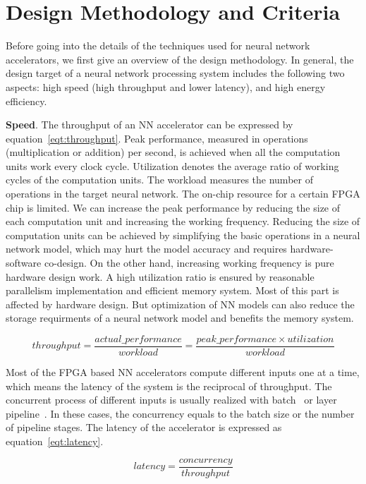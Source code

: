 \section{Design Methodology and Criteria}\label{sec:design_method}

Before going into the details of the techniques used for neural network accelerators, we first give an overview of the design methodology. In general, the design target of a neural network processing system includes the following two aspects: high speed (high throughput and lower latency), and high energy efficiency.

\textbf{Speed}. The throughput of an NN accelerator can be expressed by equation~\ref{eqt:throughput}. Peak performance, measured in operations (multiplication or addition) per second, is achieved when all the computation units work every clock cycle. Utilization denotes the average ratio of working cycles of the computation units. The workload measures the number of operations in the target neural network. The on-chip resource for a certain FPGA chip is limited. We can increase the peak performance by reducing the size of each computation unit and increasing the working frequency. Reducing the size of computation units can be achieved by simplifying the basic operations in a neural network model, which may hurt the model accuracy and requires hardware-software co-design. On the other hand, increasing working frequency is pure hardware design work. A high utilization ratio is ensured by reasonable parallelism implementation and efficient memory system. Most of this part is affected by hardware design. But optimization of NN models can also reduce the storage requirments of a neural network model and benefits the memory system.

\begin{equation}\label{eqt:throughput}
    throughput = \frac{actual\_performance}{workload} = \frac{peak\_performance \times utilization}{workload}
\end{equation}

Most of the FPGA based NN accelerators compute different inputs one at a time, which means the latency of the system is the reciprocal of throughput. The concurrent process of different inputs is usually realized with batch~\cite{lu2017evaluating} or layer pipeline~\cite{li2016high}. In these cases, the concurrency equals to the batch size or the number of pipeline stages. The latency of the accelerator is expressed as equation~\ref{eqt:latency}. 

\begin{equation}\label{eqt:latency}
    latency = \frac{concurrency}{throughput}
\end{equation}

